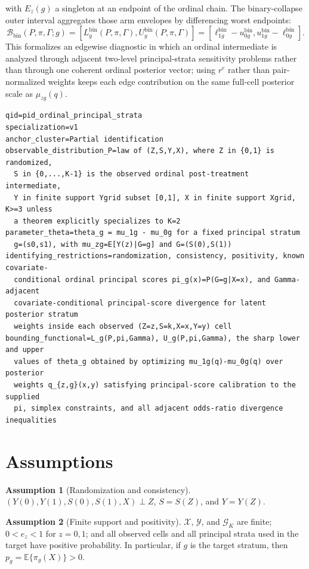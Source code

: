 \documentclass[11pt]{article}
\newcommand{\E}{\mathbb{E}}
\theoremstyle{definition}
\newtheorem{assumption}{Assumption}
\theoremstyle{plain}
\theoremstyle{remark}
\begin{document}
with \(E_z(g)\) a singleton at an endpoint of the ordinal chain.  The binary-collapse outer interval aggregates those arm envelopes by differencing worst endpoints:
\[
  \mathcal B_{\mathrm{bin}}(P,\pi,\Gamma;g)
  =
  [L^{\mathrm{bin}}_g(P,\pi,\Gamma),U^{\mathrm{bin}}_g(P,\pi,\Gamma)]
  =
  [\ell^{\mathrm{bin}}_{1g}-u^{\mathrm{bin}}_{0g},
   u^{\mathrm{bin}}_{1g}-\ell^{\mathrm{bin}}_{0g}].
\]
This formalizes an edgewise diagnostic in which an ordinal intermediate is analyzed through adjacent two-level principal-strata sensitivity problems rather than through one coherent ordinal posterior vector; using \(r^e\) rather than pair-normalized weights keeps each edge contribution on the same full-cell posterior scale as \(\mu_{zg}(q)\).

\begin{verbatim}
qid=pid_ordinal_principal_strata
specialization=v1
anchor_cluster=Partial identification
observable_distribution_P=law of (Z,S,Y,X), where Z in {0,1} is randomized,
  S in {0,...,K-1} is the observed ordinal post-treatment intermediate,
  Y in finite support Ygrid subset [0,1], X in finite support Xgrid, K>=3 unless
  a theorem explicitly specializes to K=2
parameter_theta=theta_g = mu_1g - mu_0g for a fixed principal stratum
  g=(s0,s1), with mu_zg=E[Y(z)|G=g] and G=(S(0),S(1))
identifying_restrictions=randomization, consistency, positivity, known covariate-
  conditional ordinal principal scores pi_g(x)=P(G=g|X=x), and Gamma-adjacent
  covariate-conditional principal-score divergence for latent posterior stratum
  weights inside each observed (Z=z,S=k,X=x,Y=y) cell
bounding_functional=L_g(P,pi,Gamma), U_g(P,pi,Gamma), the sharp lower and upper
  values of theta_g obtained by optimizing mu_1g(q)-mu_0g(q) over posterior
  weights q_{z,g}(x,y) satisfying principal-score calibration to the supplied
  pi, simplex constraints, and all adjacent odds-ratio divergence inequalities
\end{verbatim}

\section{Assumptions}
\begin{assumption}[Randomization and consistency]\label{ass:randomization}
\((Y(0),Y(1),S(0),S(1),X)\perp Z\), \(S=S(Z)\), and \(Y=Y(Z)\).
\end{assumption}

\begin{assumption}[Finite support and positivity]\label{ass:positivity}
\(\mathcal X\), \(\mathcal Y\), and \(\mathcal G_K\) are finite; \(0<e_z<1\) for \(z=0,1\); and all observed cells and all principal strata used in the target have positive probability.  In particular, if \(g\) is the target stratum, then \(p_g=\E\{\pi_g(X)\}>0\).
\end{assumption}
\end{document}
